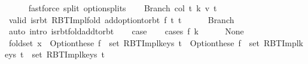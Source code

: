 \begin{isabellebody}
\ \ \ \ \isamarkupfalse%
\ {\isacharparenleft}{\kern0pt}fastforce\ split{\isacharcolon}{\kern0pt}\ option{\isachardot}{\kern0pt}splits{\isacharparenright}{\kern0pt}\isanewline
{}\isamarkupfalse%
\isanewline
\ \ \isamarkupfalse%
\ {\isacharparenleft}{\kern0pt}Branch\ col\ t{}\ k\ v\ t{}{\isacharparenright}{\kern0pt}\isanewline
\ \ \isamarkupfalse%
\ valid{\isacharcolon}{\kern0pt}\ {\isachardoublequoteopen}is{\isacharunderscore}{\kern0pt}rbt\ {\isacharparenleft}{\kern0pt}RBT{\isacharunderscore}{\kern0pt}Impl{\isachardot}{\kern0pt}fold\ {\isacharparenleft}{\kern0pt}add{\isacharunderscore}{\kern0pt}option{\isacharunderscore}{\kern0pt}to{\isacharunderscore}{\kern0pt}rbt\ f{\isacharparenright}{\kern0pt}\ t{}\ t{\isacharprime}{\kern0pt}{\isacharparenright}{\kern0pt}{\isachardoublequoteclose}\isanewline
\ \ \ \ \isamarkupfalse%
\ Branch{\isacharparenleft}{\kern0pt}{}{\isacharparenright}{\kern0pt}\isanewline
\ \ \ \ \isamarkupfalse%
\ {\isacharparenleft}{\kern0pt}auto\ intro{\isacharcolon}{\kern0pt}\ is{\isacharunderscore}{\kern0pt}rbt{\isacharunderscore}{\kern0pt}fold{\isacharunderscore}{\kern0pt}add{\isacharunderscore}{\kern0pt}to{\isacharunderscore}{\kern0pt}rbt{\isacharparenright}{\kern0pt}\isanewline
\ \ \isamarkupfalse%
\ {\isacharquery}{\kern0pt}case\isanewline
\ \ \isamarkupfalse%
\ {\isacharparenleft}{\kern0pt}cases\ {\isachardoublequoteopen}f\ k{\isachardoublequoteclose}{\isacharparenright}{\kern0pt}\isanewline
\ \ \ \ \isamarkupfalse%
\ None\isanewline
\ \ \ \ \isamarkupfalse%
\ fold{\isacharunderscore}{\kern0pt}set{\isacharcolon}{\kern0pt}\ {\isachardoublequoteopen}x\ {\isasymin}\ Option{\isachardot}{\kern0pt}these\ {\isacharparenleft}{\kern0pt}f\ {\isacharbackquote}{\kern0pt}\ set\ {\isacharparenleft}{\kern0pt}RBT{\isacharunderscore}{\kern0pt}Impl{\isachardot}{\kern0pt}keys\ t{}{\isacharparenright}{\kern0pt}{\isacharparenright}{\kern0pt}\ {\isasymunion}\ {\isacharparenleft}{\kern0pt}{\isacharparenleft}{\kern0pt}Option{\isachardot}{\kern0pt}these\ {\isacharparenleft}{\kern0pt}f\ {\isacharbackquote}{\kern0pt}\ set\ {\isacharparenleft}{\kern0pt}RBT{\isacharunderscore}{\kern0pt}Impl{\isachardot}{\kern0pt}keys\ t{}{\isacharparenright}{\kern0pt}{\isacharparenright}{\kern0pt}\ {\isasymunion}\ set\ {\isacharparenleft}{\kern0pt}RBT{\isacharunderscore}{\kern0pt}Impl{\isachardot}{\kern0pt}keys\ t{\isacharprime}{\kern0pt}{\isacharparenright}{\kern0pt}{\isacharparenright}{\kern0pt}{\isacharparenright}{\kern0pt}\ {\isasymlongleftrightarrow}\isanewline

\end{isabellebody}
